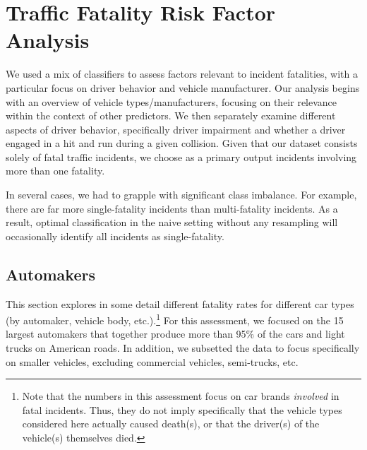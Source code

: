 \documentclass[11pt, oneside,titlepage]{article}   	%
\begin{document}
\section*{Traffic Fatality Risk Factor Analysis}
We used a mix of classifiers to assess factors relevant to incident fatalities, with a particular focus on driver behavior and vehicle manufacturer. Our analysis begins with an overview of vehicle types/manufacturers, focusing on their relevance within the context of other predictors. We then separately examine different aspects of driver behavior, specifically driver impairment and whether a driver engaged in a hit and run during a given collision. Given that our dataset consists solely of fatal traffic incidents, we choose as a primary output incidents involving more than one fatality.

In several cases, we had to grapple with significant class imbalance. For example, there are far more single-fatality incidents than multi-fatality incidents. As a result, optimal classification in the naive setting without any resampling will occasionally identify all incidents as single-fatality.   

\subsection*{Automakers}

This section explores in some detail different fatality rates for different car types (by automaker, vehicle body, etc.).\footnote{Note that the numbers in this assessment focus on car brands \textit{involved} in fatal incidents. Thus, they do not imply specifically that the vehicle types considered here actually caused death(s), or that the driver(s) of the vehicle(s) themselves died.} For this assessment, we focused on the 15 largest automakers that together produce more than 95\% of the cars and light trucks on American roads. In addition, we subsetted the data to focus specifically on smaller vehicles, excluding commercial vehicles, semi-trucks, etc. \\
\end{document}
